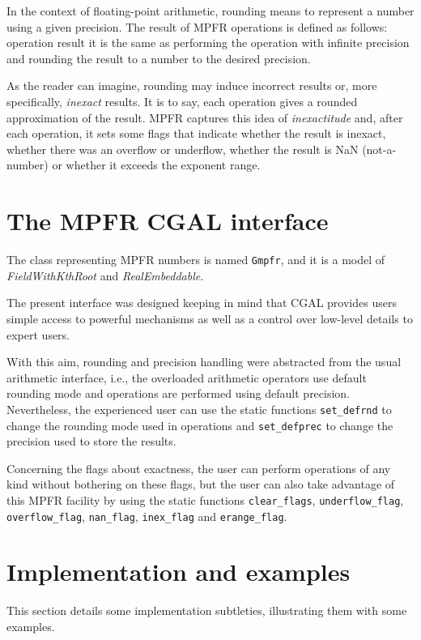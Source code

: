 In the context of floating-point arithmetic, rounding means to represent
a number using a given precision.
The result of MPFR operations is defined as follows: operation result
it is the same as performing the operation with infinite precision and
rounding the result to a number to the desired precision.

As the reader can imagine, rounding may induce incorrect results or,
more specifically, \emph{inexact} results.
It is to say, each operation gives a rounded approximation of the
result.
MPFR captures this idea of \emph{inexactitude} and, after each
operation, it sets some flags that indicate whether the result is
inexact, whether there was an overflow or underflow, whether the
result is NaN (not-a-number) or whether it exceeds the exponent range.


\section{The MPFR CGAL interface}

The class representing MPFR numbers is named \verb=Gmpfr=, and it is a
model of \emph{FieldWithKthRoot} and \emph{RealEmbeddable}.

The present interface was designed keeping in mind that CGAL provides
users simple access to powerful mechanisms as well as a control over
low-level details to expert users.

With this aim, rounding and precision handling were abstracted from the
usual arithmetic interface, i.e., the overloaded arithmetic operators
use default rounding mode and operations are performed using default
precision.
Nevertheless, the experienced user can use the static functions
\verb=set_defrnd= to change the rounding mode used in operations
and \verb=set_defprec= to change the precision used to store
the results.

Concerning the flags about exactness, the user can perform operations
of any kind without bothering on these flags, but the user can also
take advantage of this MPFR facility by using the static functions
\verb=clear_flags=, \verb=underflow_flag=, \verb=overflow_flag=,
\verb=nan_flag=, \verb=inex_flag= and \verb=erange_flag=.


\section{Implementation and examples}

This section details some implementation subtleties, illustrating them
with some examples.


